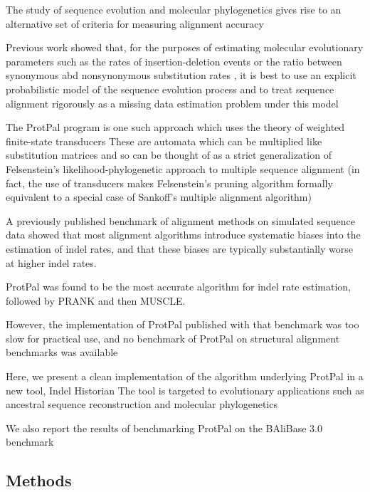 \documentclass{bioinfo}
\begin{document}
The study of sequence evolution and molecular phylogenetics gives rise to
an alternative set of criteria for measuring alignment accuracy

Previous work showed that, for the purposes of estimating
molecular evolutionary parameters
such as the rates of insertion-deletion events \cite{Westesson2012-zg}
or the ratio between synonymous abd nonsynonymous substitution rates \cite{Redelings},
it is best to use an explicit probabilistic model of the sequence evolution process
and to treat sequence alignment rigorously as a missing data estimation problem
under this model


The ProtPal program is one such approach which uses the theory of
weighted finite-state transducers
These are automata which can be multiplied like substitution matrices
and so can be thought of as a strict generalization of Felsenstein's likelihood-phylogenetic
approach to multiple sequence alignment
(in fact, the use of transducers makes Felsenstein's pruning algorithm formally
equivalent to a special case of Sankoff's multiple alignment algorithm)

A previously published benchmark of alignment methods on simulated sequence data
showed that most alignment algorithms introduce systematic biases into the
estimation of indel rates, and that these biases are typically substantially worse
at higher indel rates.

ProtPal was found to be the most accurate algorithm for indel rate estimation,
followed by PRANK and then MUSCLE.

However, the implementation of ProtPal published with that benchmark was too slow
for practical use, and no benchmark of ProtPal on structural alignment benchmarks was available

Here, we present a clean implementation of the algorithm underlying ProtPal
in a new tool, Indel Historian
The tool is targeted to evolutionary applications such
as ancestral sequence reconstruction and molecular phylogenetics

We also report the results of benchmarking ProtPal on the BAliBase 3.0 benchmark

\begin{methods}
\section{Methods}

\cite{Westesson2012-zg}

\end{methods}
\end{document}
